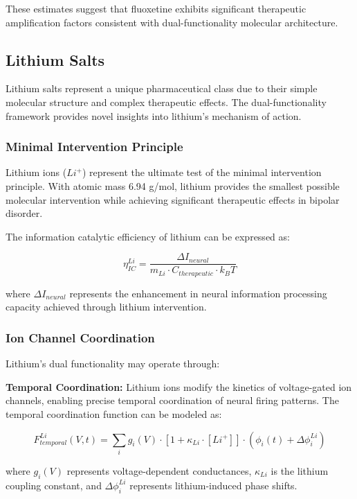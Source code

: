 \documentclass[12pt,a4paper]{article}
\begin{document}
These estimates suggest that fluoxetine exhibits significant therapeutic amplification factors consistent with dual-functionality molecular architecture.

\subsection{Lithium Salts}

Lithium salts represent a unique pharmaceutical class due to their simple molecular structure and complex therapeutic effects. The dual-functionality framework provides novel insights into lithium's mechanism of action.

\subsubsection{Minimal Intervention Principle}

Lithium ions ($Li^+$) represent the ultimate test of the minimal intervention principle. With atomic mass 6.94 g/mol, lithium provides the smallest possible molecular intervention while achieving significant therapeutic effects in bipolar disorder.

The information catalytic efficiency of lithium can be expressed as:

$$\eta_{IC}^{Li} = \frac{\Delta I_{neural}}{m_{Li} \cdot C_{therapeutic} \cdot k_B T}$$

where $\Delta I_{neural}$ represents the enhancement in neural information processing capacity achieved through lithium intervention.

\subsubsection{Ion Channel Coordination}

Lithium's dual functionality may operate through:

\textbf{Temporal Coordination:} Lithium ions modify the kinetics of voltage-gated ion channels, enabling precise temporal coordination of neural firing patterns. The temporal coordination function can be modeled as:

$$F_{temporal}^{Li}(V, t) = \sum_{i} g_i(V) \cdot [1 + \kappa_{Li} \cdot [Li^+]] \cdot (\phi_i(t) + \Delta\phi_i^{Li})$$

where $g_i(V)$ represents voltage-dependent conductances, $\kappa_{Li}$ is the lithium coupling constant, and $\Delta\phi_i^{Li}$ represents lithium-induced phase shifts.
\end{document}
